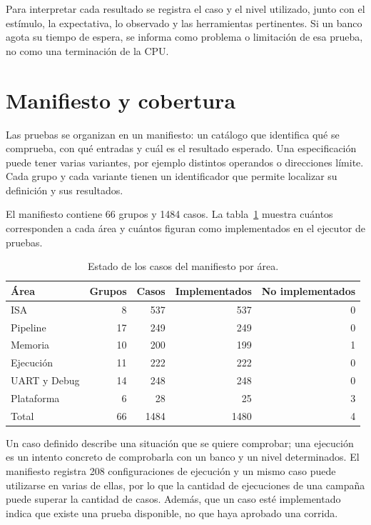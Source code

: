 Para interpretar cada resultado se registra el caso y el nivel utilizado, junto
con el estímulo, la expectativa, lo observado y las herramientas
pertinentes. Si un banco agota su tiempo de espera, se informa como problema o
limitación de esa prueba, no como una terminación  de la CPU.

\section{Manifiesto y cobertura}

Las pruebas se organizan en un manifiesto: un catálogo que identifica qué se
comprueba, con qué entradas y cuál es el resultado esperado. Una especificación
puede tener varias variantes, por ejemplo distintos operandos o direcciones
límite. Cada grupo y cada variante tienen un identificador que permite localizar
su definición y sus resultados.

El manifiesto contiene 66 grupos y 1484 casos. La
tabla~\ref{tab:manifiesto} muestra cuántos corresponden a cada área y cuántos
figuran como implementados en el ejecutor de pruebas.

\begin{table}[H]
  \centering
  \small
  \begin{tabular}{lrrrr}
    \toprule
    \textbf{Área} & \textbf{Grupos} & \textbf{Casos} & \textbf{Implementados} &
    \textbf{No implementados} \\
    \midrule
    ISA & 8 & 537 & 537 & 0 \\
    Pipeline & 17 & 249 & 249 & 0 \\
    Memoria & 10 & 200 & 199 & 1 \\
    Ejecución & 11 & 222 & 222 & 0 \\
    UART y Debug & 14 & 248 & 248 & 0 \\
    Plataforma & 6 & 28 & 25 & 3 \\
    \midrule
    Total & 66 & 1484 & 1480 & 4 \\
    \bottomrule
  \end{tabular}
  \caption{Estado de los casos del manifiesto por área.}
  \label{tab:manifiesto}
\end{table}

Un caso definido describe una situación que se quiere comprobar; una ejecución
es un intento concreto de comprobarla con un banco y un nivel determinados. El
manifiesto registra 208 configuraciones de ejecución y un mismo caso puede
utilizarse en varias de ellas, por lo que la cantidad de ejecuciones de una
campaña puede superar la cantidad de casos. Además, que un caso esté
implementado indica que existe una prueba disponible, no que haya aprobado una
corrida.

